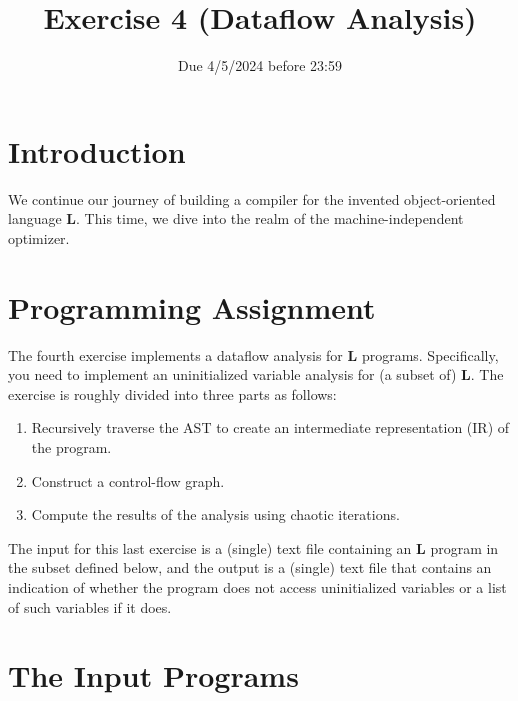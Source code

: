 \documentclass{article}
\begin{document}
\title{Exercise 4 (Dataflow Analysis)}


\date{Due 4/5/2024 before 23:59}

\maketitle

\newcommand{\plname}{\textbf{L}\xspace}

\section{Introduction}
We continue our journey of building a compiler
for the invented object-oriented language \plname.
This time, we dive into the realm of the machine-independent optimizer. 
 
\section{Programming Assignment}
The fourth exercise implements a dataflow analysis for \plname programs.
Specifically, you need to implement an uninitialized variable analysis for (a subset of) \plname.
The exercise is roughly divided into three parts as follows:
\begin{enumerate}
\item Recursively traverse the AST to create
an intermediate representation (IR) of the program.
\item Construct a control-flow graph.
\item Compute the results of the analysis using chaotic iterations.
\end{enumerate}

The input for this last exercise is a (single) text file containing an \plname
program in the subset defined below,
and the output is a (single) text file that contains an indication of whether the program does not access uninitialized variables or a list of such variables if it does.

\section{The Input Programs}
\end{document}
